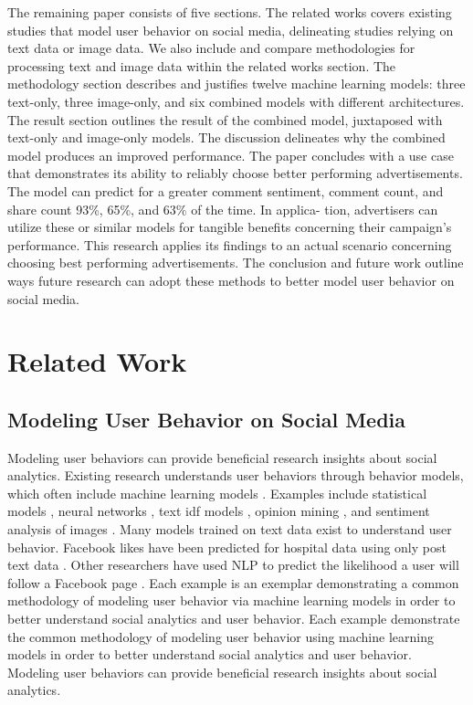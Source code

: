 \documentclass[mksc,blindrev]{informs3} %
\begin{document}
The remaining paper consists of five sections. The related works covers existing
studies that model user behavior on social media, delineating studies relying on text data or image data. We also include  and compare methodologies for processing text and image data within the related works section. The methodology section describes and justifies twelve machine learning models: three text-only, three image-only, and six combined models with different architectures. The result section outlines the result of the combined model, juxtaposed with text-only and image-only models. The discussion delineates why
the combined model produces an improved performance. The paper concludes with a use case that demonstrates its ability to reliably choose better performing advertisements. The model can predict for a greater comment sentiment, comment count, and share count 93\%, 65\%, and 63\% of the time. In applica- tion, advertisers can utilize these or similar models for tangible benefits concerning their campaign’s performance. This research applies its findings to an actual scenario concerning choosing best performing advertisements. The conclusion and future work outline ways future research can adopt these methods to better model user behavior on social media.


\section{Related Work}

\subsection{Modeling User Behavior on Social Media}

Modeling user behaviors can provide beneficial research insights about social analytics. Existing research understands user behaviors through behavior models, which often include machine learning models \cite{Li2015, 8029313, Ohsawa2013, Liu2012, Li2015}.  Examples include statistical models \cite{Li2015}, neural networks \cite{8029313}, text idf models \cite{Ohsawa2013}, opinion mining \cite{Liu2012}, and sentiment analysis of images \cite{Wang2015}. Many models trained on text data exist to understand user behavior. Facebook likes have been predicted for hospital data using only post text data \cite{Stranton2017}. Other researchers have used NLP to predict the likelihood a user will follow a Facebook page \cite{Ohsawa2013}. Each example is an exemplar demonstrating a common methodology of modeling user behavior via machine learning models in order to better understand social analytics and user behavior. Each  example demonstrate the common methodology of modeling user behavior using machine learning models in order to better understand social analytics and user behavior. Modeling user behaviors can provide beneficial research insights about social analytics.
\end{document}
